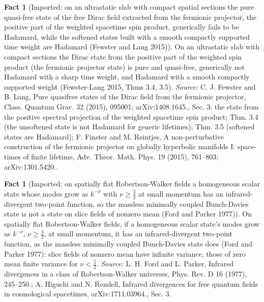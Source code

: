 \documentclass[11pt]{article}
\theoremstyle{definition}
\newtheorem{fact}[theorem]{Fact}
\theoremstyle{plain}
\begin{document}
\begin{fact}[Imported: on an ultrastatic slab with compact spatial sections the pure quasi-free state of the free Dirac field extracted from the fermionic projector, the positive part of the weighted spacetime spin product, generically fails to be Hadamard, while the softened states built with a smooth compactly supported time weight are Hadamard (Fewster and Lang 2015)]\label{c:synthesis.imported-fewster-lang-spin-product-states-of-the-dirac-field}
On an ultrastatic slab with compact sections the Dirac state from the positive part of the weighted spin product (the fermionic projector state) is pure and quasi-free, generically not Hadamard with a sharp time weight, and Hadamard with a smooth compactly supported weight (Fewster-Lang 2015, Thms 3.4, 3.5).
\emph{Source:} C. J. Fewster and B. Lang, Pure quasifree states of the Dirac field from the fermionic projector, Class. Quantum Grav. 32 (2015), 095001; arXiv:1408.1645., Sec. 3: the state from the positive spectral projection of the weighted spacetime spin product; Thm. 3.4 (the unsoftened state is not Hadamard for generic lifetimes); Thm. 3.5 (softened states are Hadamard); F. Finster and M. Reintjes, A non-perturbative construction of the fermionic projector on globally hyperbolic manifolds I: space-times of finite lifetime, Adv. Theor. Math. Phys. 19 (2015), 761--803; arXiv:1301.5420..
\end{fact}

\begin{fact}[Imported: on spatially flat Robertson-Walker fields a homogeneous scalar state whose modes grow as $k^{-\nu}$ with $\nu \ge \tfrac32$ at small momentum has an infrared-divergent two-point function, so the massless minimally coupled Bunch-Davies state is not a state on slice fields of nonzero mean (Ford and Parker 1977)]\label{c:synthesis.imported-ford-parker-infrared-divergence}
On spatially flat Robertson-Walker fields, if a homogeneous scalar state's modes grow as $k^{-\nu}$, $\nu \ge \tfrac32$, at small momentum, it has an infrared-divergent two-point function, as the massless minimally coupled Bunch-Davies state does (Ford and Parker 1977): slice fields of nonzero mean have infinite variance, those of zero mean finite variance for $\nu < \tfrac52$.
\emph{Source:} L. H. Ford and L. Parker, Infrared divergences in a class of Robertson-Walker universes, Phys. Rev. D 16 (1977), 245--250.; A. Higuchi and N. Rendell, Infrared divergences for free quantum fields in cosmological spacetimes, arXiv:1711.03964., Sec. 3.
\end{fact}
\end{document}
